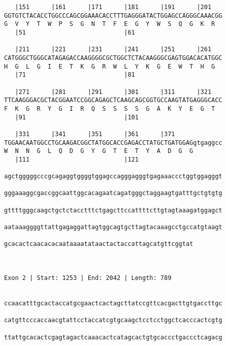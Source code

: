 \documentclass{article}
\begin{document}
\begin{Verbatim}
   |151      |161      |171      |181      |191      |201   
GGTGTCTACACCTGGCCCAGCGGAAACACCTTTGAGGGATACTGGAGCCAGGGCAAACGG
G  V  Y  T  W  P  S  G  N  T  F  E  G  Y  W  S  Q  G  K  R  
   |51                           |61                        
  
   |211      |221      |231      |241      |251      |261   
CATGGGCTGGGCATAGAGACCAAGGGGCGCTGGCTCTACAAGGGCGAGTGGACACATGGC
H  G  L  G  I  E  T  K  G  R  W  L  Y  K  G  E  W  T  H  G  
   |71                           |81                        
  
   |271      |281      |291      |301      |311      |321   
TTCAAGGGACGCTACGGAATCCGGCAGAGCTCAAGCAGCGGTGCCAAGTATGAGGGCACC
F  K  G  R  Y  G  I  R  Q  S  S  S  S  G  A  K  Y  E  G  T  
   |91                           |101                       
  
   |331      |341      |351      |361      |371             
TGGAACAATGGCCTGCAAGACGGCTATGGCACCGAGACCTATGCTGATGGAGgtgaggcc
W  N  N  G  L  Q  D  G  Y  G  T  E  T  Y  A  D  G  G        
   |111                          |121                       
  
agctgggggcccgcagaggtggggtggagccagggagggtgagaaaccctggtggagggt
                                                            
gggaaaggcgaccggcaattggcacagaatcagatgggctaggaagtgatttgctgtgtg
                                                            
gttttgggcaagctgctctacctttctgagcttccattttcttgtagtaaagatggagct
                                                            
aataaaggggttattgagaggattagtggcagtgcttagtacaaagcctgccatgtaagt
                                                            
gcacactcaacacacaataaaatataactactaccattagcatgttcggtat
                                                    
                                                    
 
Exon 2 | Start: 1253 | End: 2042 | Length: 789


ccaacatttgcactaccatgcgaactcactagcttatccgttcacgacttgtgaccttgc
                                                            
catgttcccaccaacgtattcctaccatcgtgcaagctcctcctggctcacccactcgtg
                                                            
ttattgcacactcgagtagactcaaacactcatagcactgtgcaccctgaccctcagacg
                                                            

\end{Verbatim}
\end{document}
